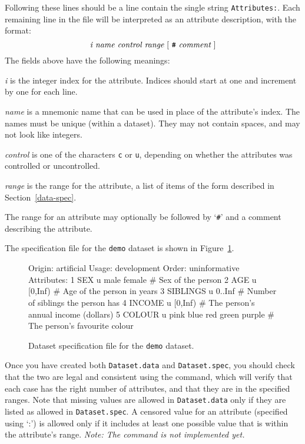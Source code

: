 Following these lines should be a line contain the single string
\texttt{Attributes:}.  Each remaining line in the file will be
interpreted as an attribute description, with the format:
\[
\mbox{{\em i name control range} [ {\tt \#} {\em comment} ]}
\]
The fields above have the following meanings:\vspace{-3pt}
\begin{list}{}{%
\setlength{\leftmargin}{0.9in}%
\setlength{\labelwidth}{0.5in}%
\setlength{\labelsep}{0.18in}}
\item[{\em i\hfill}] is the integer index for the
    attribute. Indices should start at one and increment by one for
    each line.
\item[{\em name\hfill}] is a mnemonic name that can be used in place
    of the attribute's index.  The names must be unique (within a
    dataset).  They may not contain spaces, and may not look like 
    integers.
\item[{\em control\hfill}] is one of the characters \texttt{c} or
    \texttt{u}, depending on whether the attributes was controlled or
    uncontrolled.
\item[{\em range\hfill}] is the range for the attribute, a list of items of
    the form described in Section~\ref{data-spec}.
\end{list}\vspace{-3pt}
The range for an attribute may optionally be followed by `{\tt \#}'
and a comment describing the attribute.

The specification file for the \texttt{demo} dataset is shown in
Figure~\ref{fig:dataset-spec}.

\begin{figure}[t]
\begin{Session}
Origin: artificial
Usage: development
Order: uninformative
Attributes:
 1 SEX      u male female  # Sex of the person
 2 AGE      u [0,Inf)      # Age of the person in years
 3 SIBLINGS u 0..Inf       # Number of siblings the person has
 4 INCOME   u [0,Inf)      # The person's annual income (dollars)
 5 COLOUR   u pink blue red green purple  # The person's favourite colour
\end{Session}
\caption{Dataset specification file for the \texttt{demo} dataset.}
\label{fig:dataset-spec}
\end{figure}

Once you have created both \texttt{Dataset.data} and
\texttt{Dataset.spec}, you should check that the two are legal and
consistent using the \dcheck{} command, which will verify that each
case has the right number of attributes, and that they are in the
specified ranges. Note that missing values are allowed in
\texttt{Dataset.data} only if they are listed as allowed in
\texttt{Dataset.spec}.  A censored value for an attribute (specified
using `:') is allowed only if it includes at least one possible
value that is within the attribute's range.
\emph{Note: The \dcheck{} command is not implemented yet.}
